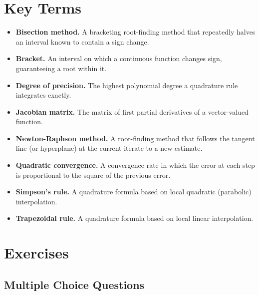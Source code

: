 \documentclass[
]{article}
\providecommand{\tightlist}{%
  \setlength{\itemsep}{0pt}\setlength{\parskip}{0pt}}
\begin{document}
\section{Key Terms}\label{key-terms}

\begin{itemize}
\tightlist
\item
  \textbf{Bisection method.} A bracketing root-finding method that
  repeatedly halves an interval known to contain a sign change.
\item
  \textbf{Bracket.} An interval on which a continuous function changes
  sign, guaranteeing a root within it.
\item
  \textbf{Degree of precision.} The highest polynomial degree a
  quadrature rule integrates exactly.
\item
  \textbf{Jacobian matrix.} The matrix of first partial derivatives of a
  vector-valued function.
\item
  \textbf{Newton-Raphson method.} A root-finding method that follows the
  tangent line (or hyperplane) at the current iterate to a new estimate.
\item
  \textbf{Quadratic convergence.} A convergence rate in which the error
  at each step is proportional to the square of the previous error.
\item
  \textbf{Simpson's rule.} A quadrature formula based on local quadratic
  (parabolic) interpolation.
\item
  \textbf{Trapezoidal rule.} A quadrature formula based on local linear
  interpolation.
\end{itemize}

\section{Exercises}\label{exercises}

\subsection{Multiple Choice Questions}\label{multiple-choice-questions}
\end{document}
